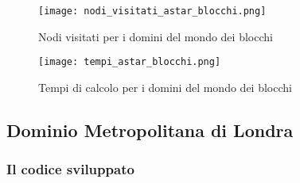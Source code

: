 \begin{figure}[!htp]
  \centering
  \texttt{[image: nodi\_visitati\_astar\_blocchi.png]}
  \caption{Nodi visitati per i domini del mondo dei blocchi}
  \label{fig:figure15}
\end{figure}

\begin{figure}[!htp]
  \centering
  \texttt{[image: tempi\_astar\_blocchi.png]}
  \caption{Tempi di calcolo per i domini del mondo dei blocchi}
  \label{fig:figure16}
\end{figure}

\subsection{Dominio Metropolitana di Londra}

\subsubsection{Il codice sviluppato}

